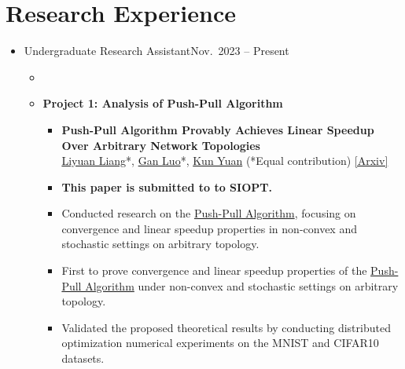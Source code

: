 \section{Research Experience}
\begin{itemize}
    \item {}
          {Undergraduate Research Assistant}{Nov.\ 2023 -- Present}
          \begin{itemize}
              \item {}
              
              \item \textbf{Project 1: Analysis of Push-Pull Algorithm}
              \begin{itemize}
              \item \textbf{Push-Pull Algorithm Provably Achieves Linear
Speedup Over Arbitrary Network Topologies}\\
\href{https://lavaei.ieor.berkeley.edu/Group.html}{Liyuan Liang}*, \underline{Gan Luo}*,  \href{https://kunyuan827.github.io}{Kun Yuan} (*Equal contribution) \href{https://arxiv.org/abs/2506.18075}{[Arxiv]}
                  \item {\textbf{This paper is submitted to to SIOPT.}}
                  \item {Conducted research on the \href{https://arxiv.org/pdf/1810.06653v4}{Push-Pull Algorithm}, focusing on convergence and linear speedup properties in non-convex and stochastic settings on arbitrary topology.}
                  \item First to prove convergence and linear speedup properties of the \href{https://arxiv.org/pdf/1810.06653v4}{Push-Pull Algorithm} under non-convex and stochastic settings  on arbitrary topology.
                  \item Validated the proposed theoretical results by conducting distributed optimization numerical experiments on the MNIST and CIFAR10 datasets.
              \end{itemize}
              

\end{itemize}
\end{itemize}
